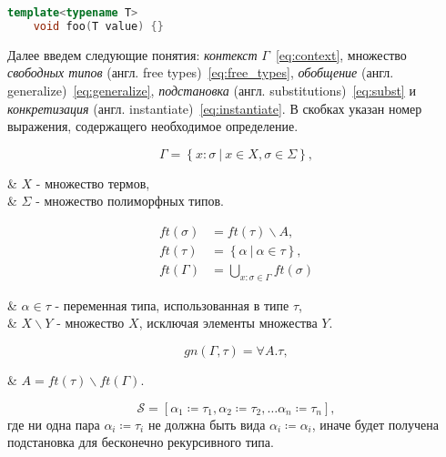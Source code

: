 \begin{lstlisting}[language=C++,label=lst:generics,caption={Определение обобщенной функции в C++}]
    template<typename T>
    void foo(T value) {}
\end{lstlisting}

Далее введем следующие понятия:
\textit{контекст} $\Gamma$~\eqref{eq:context},
множество \textit{свободных типов} (англ. free types)~\eqref{eq:free_types},
\textit{обобщение} (англ. generalize)~\eqref{eq:generalize},
\textit{подстановка} (англ. substitutions)~\eqref{eq:subst} и
\textit{конкретизация} (англ. instantiate)~\eqref{eq:instantiate}.
В скобках указан номер выражения, содержащего необходимое определение.

\begin{equation}
    \label{eq:context}
    \Gamma = \left\{ x: \sigma ~|~ x \in X, \sigma \in \Sigma \right\},
\end{equation}
\begin{eqrem}
    & $X$ - множество термов,                 \\
    & $\Sigma$ - множество полиморфных типов. \\
\end{eqrem}

\begin{equation}
    \label{eq:free_types}
    \begin{aligned}
        ft(\sigma) &= ft(\tau) \backslash A, \\
        ft(\tau)   &= \left\{ \alpha ~|~ \alpha \in \tau \right\}, \\
        ft(\Gamma) &= \bigcup_{x: \sigma \in \Gamma} ft(\sigma)
    \end{aligned}
\end{equation}
\begin{eqrem}
    & $\alpha \in \tau$ - переменная типа, использованная в типе $\tau$, \\
    & $X \backslash Y$ - множество $X$, исключая элементы множества $Y$. \\
\end{eqrem}

\begin{equation}
    \label{eq:generalize}
    gn(\Gamma, \tau) = \forall A. \tau,
\end{equation}
\begin{eqrem}
    & $A = ft(\tau) \backslash ft(\Gamma)$.\\
\end{eqrem}

\begin{equation}
    \label{eq:subst}
    \mathcal{S} = \left[ \alpha_1 \coloneqq \tau_1, \alpha_2 \coloneqq \tau_2, \ldots \alpha_n \coloneqq \tau_n \right],
\end{equation}
где ни одна пара $\alpha_i \coloneqq \tau_i$ не должна быть вида $\alpha_i \coloneqq \alpha_i$, иначе будет получена подстановка для бесконечно рекурсивного типа.

